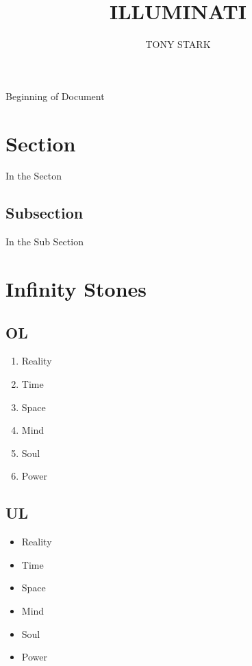 \documentclass{article}
\title{ILLUMINATI}
\author{TONY STARK}
\begin{document}
	\maketitle
	\tableofcontents
	\pagebreak
	Beginning of Document
	\section{Section}
	In the Secton
	\subsection{Subsection}
	In the Sub Section
	\pagebreak
	\section{Infinity Stones}
	\hspace{2cm}
	\small
	\subsection{OL}
	\begin{enumerate}
		\item Reality
		\item Time
		\item Space
		\item Mind
		\item Soul
		\item Power
	\end{enumerate}
	\hspace{2cm}
	\subsection{UL}
	\begin{itemize}
		\item Reality
		\item Time
		\item Space
		\item Mind
		\item Soul
		\item Power 
	\end{itemize}
	\hspace{2cm}
\end{document}
